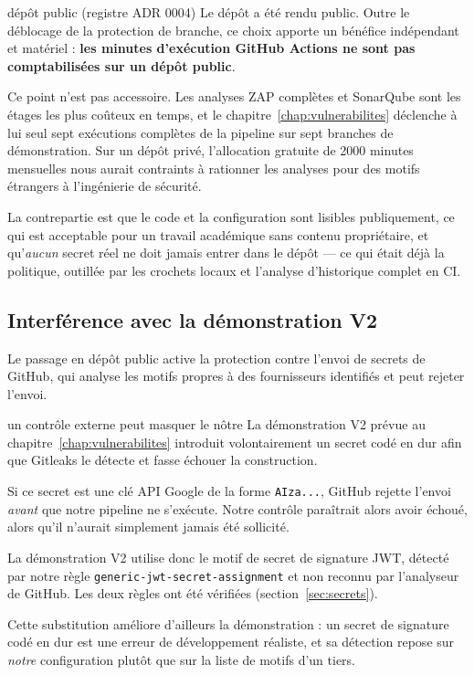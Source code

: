 \begin{decision}{dépôt public (registre ADR 0004)}
Le dépôt a été rendu public. Outre le déblocage de la protection de branche,
ce choix apporte un bénéfice indépendant et matériel : \textbf{les minutes
d'exécution GitHub Actions ne sont pas comptabilisées sur un dépôt public}.

Ce point n'est pas accessoire. Les analyses ZAP complètes et SonarQube sont les
étages les plus coûteux en temps, et le chapitre~\ref{chap:vulnerabilites}
déclenche à lui seul sept exécutions complètes de la pipeline sur sept branches
de démonstration. Sur un dépôt privé, l'allocation gratuite de 2000 minutes
mensuelles nous aurait contraints à rationner les analyses pour des motifs
étrangers à l'ingénierie de sécurité.

La contrepartie est que le code et la configuration sont lisibles publiquement,
ce qui est acceptable pour un travail académique sans contenu propriétaire, et
qu'\emph{aucun} secret réel ne doit jamais entrer dans le dépôt --- ce qui
était déjà la politique, outillée par les crochets locaux et l'analyse
d'historique complet en CI.
\end{decision}

\subsection{Interférence avec la démonstration V2}

Le passage en dépôt public active la protection contre l'envoi de secrets de
GitHub, qui analyse les motifs propres à des fournisseurs identifiés et peut
rejeter l'envoi.

\begin{constat}{un contrôle externe peut masquer le nôtre}
La démonstration V2 prévue au chapitre~\ref{chap:vulnerabilites} introduit
volontairement un secret codé en dur afin que Gitleaks le détecte et fasse
échouer la construction.

Si ce secret est une clé API Google de la forme \texttt{AIza...}, GitHub rejette
l'envoi \emph{avant} que notre pipeline ne s'exécute. Notre contrôle paraîtrait
alors avoir échoué, alors qu'il n'aurait simplement jamais été sollicité.

La démonstration V2 utilise donc le motif de secret de signature JWT, détecté
par notre règle \texttt{generic-jwt-secret-assignment} et non reconnu par
l'analyseur de GitHub. Les deux règles ont été vérifiées
(section~\ref{sec:secrets}).

Cette substitution améliore d'ailleurs la démonstration : un secret de signature
codé en dur est une erreur de développement réaliste, et sa détection repose sur
\emph{notre} configuration plutôt que sur la liste de motifs d'un tiers.
\end{constat}

